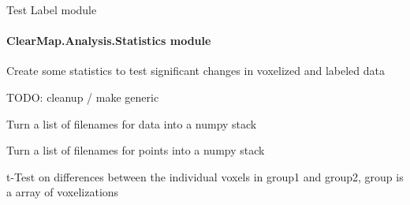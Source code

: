 \documentclass[letterpaper,10pt,english]{sphinxmanual}
\begin{document}
\begin{fulllineitems}
\label{api/ClearMap.Analysis:ClearMap.Analysis.Label.test}
Test Label module

\end{fulllineitems}



\paragraph{ClearMap.Analysis.Statistics module}
\label{api/ClearMap.Analysis:clearmap-analysis-statistics-module}\label{api/ClearMap.Analysis:module-ClearMap.Analysis.Statistics}
Create some statistics to test significant changes
in voxelized and labeled data

TODO: cleanup / make generic

\begin{fulllineitems}
\label{api/ClearMap.Analysis:ClearMap.Analysis.Statistics.readDataGroup}
Turn a list of filenames for data into a numpy stack

\end{fulllineitems}


\begin{fulllineitems}
\label{api/ClearMap.Analysis:ClearMap.Analysis.Statistics.readPointsGroup}
Turn a list of filenames for points into a numpy stack

\end{fulllineitems}


\begin{fulllineitems}
\label{api/ClearMap.Analysis:ClearMap.Analysis.Statistics.tTestVoxelization}
t-Test on differences between the individual voxels in group1 and group2, group is a array of voxelizations

\end{fulllineitems}
\end{document}
